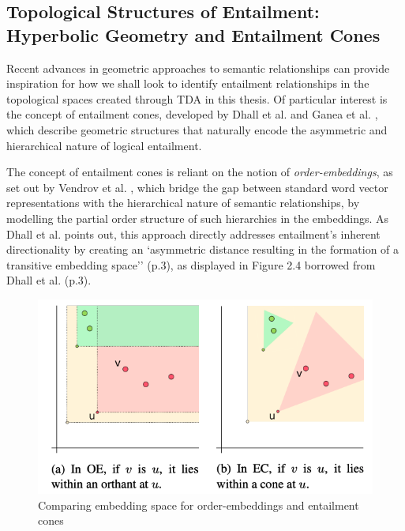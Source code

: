 \documentclass[12pt,twoside]{report}
\begin{document}
\subsection{Topological Structures of Entailment: Hyperbolic Geometry and Entailment Cones}
Recent advances in geometric approaches to semantic relationships can provide inspiration for how we shall look to identify entailment relationships in the topological spaces created through TDA in this thesis. Of particular interest is the concept of entailment cones, developed by Dhall et al. \cite{dhall2020hierarchicalimageclassificationusing} and Ganea et al. \cite{ganea2018hyperbolicentailmentconeslearning}, which describe geometric structures that naturally encode the asymmetric and hierarchical nature of logical entailment. \newline \par

The concept of entailment cones is reliant on the notion of \textit{order-embeddings}, as set out by Vendrov et al. \cite{vendrov2016orderembeddingsimageslanguage}, which bridge the gap between standard word vector representations with the hierarchical nature of semantic relationships, by modelling the partial order structure of such hierarchies in the embeddings. As Dhall et al. \cite{dhall2020hierarchicalimageclassificationusing} points out, this approach directly addresses entailment's inherent directionality by creating an `asymmetric distance resulting in the formation of a transitive embedding space'' (p.3), as displayed in Figure 2.4 borrowed from Dhall et al. (p.3).  

\begin{figure}[H]
\centering
\includegraphics[height = 0.2\textheight]{./figures/OEandEC.png}
\caption{Comparing embedding space for order-embeddings and entailment cones}
\label{fig:OE+EC}
\end{figure}
\end{document}
